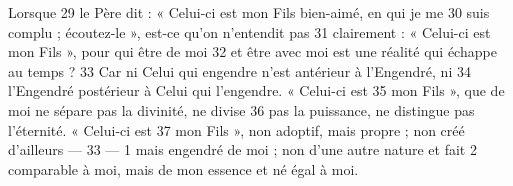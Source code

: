 Lorsque	 
29	 	le Père dit : « Celui-ci est mon Fils bien-aimé, en qui je me	 
30	 	suis complu ; écoutez-le », est-ce qu'on n'entendit pas	 
31	 	clairement : « Celui-ci est mon Fils », pour qui être de moi	 
32	 	et être avec moi est une réalité qui échappe au temps ?	 
33	 	Car ni Celui qui engendre n'est antérieur à l'Engendré, ni	 
34	 	l'Engendré postérieur à Celui qui l'engendre. « Celui-ci est	 
35	 	mon Fils », que de moi ne sépare pas la divinité, ne divise	 
36	 	pas la puissance, ne distingue pas l'éternité. « Celui-ci est	 
37	 	mon Fils », non adoptif, mais propre ; non créé d'ailleurs	 
 	--- 33 ---	 
1	 	mais engendré de moi ; non d'une autre nature et fait	 
2	 	comparable à moi, mais de mon essence et né égal à moi.